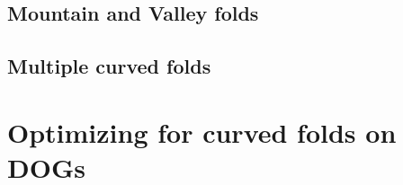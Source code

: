 \documentclass{article}
\theoremstyle{definition}
\begin{document}
\subsection{Mountain and Valley folds}


\subsection{Multiple curved folds}

	

\section{Optimizing for curved folds on DOGs}







%
%
\end{document}
